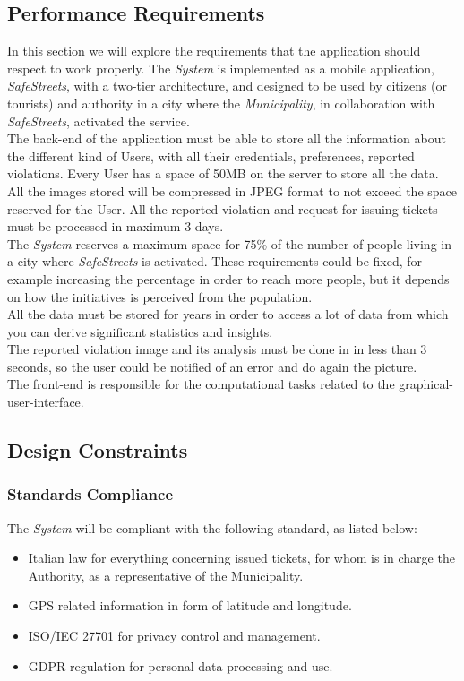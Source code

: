 \documentclass {article}
\begin{document}
	\subsection{Performance Requirements}
	In this section we will explore the requirements that the application should respect to work properly. The {\it System} is implemented as a mobile application, {\it SafeStreets}, with a two-tier architecture, and designed to be used by citizens (or tourists) and authority in a city where the {\it Municipality}, in collaboration with {\it SafeStreets}, activated the service. \\
	The back-end of the application must be able to store all the information about the different kind of Users, with all their credentials, preferences, reported violations. Every User has a space of 50MB on the server to store all the data. All the images stored will be compressed in JPEG format to not exceed the space reserved for the User. All the reported violation and request for issuing tickets must be processed in maximum 3 days.\\ 
	The {\it System} reserves a maximum space for 75\% of the number of people living in a city where {\it SafeStreets} is activated. These requirements could be fixed, for example increasing the percentage in order to reach more people, but it depends on how the initiatives is perceived from the population. \\
	All the data must be stored for years in order to access a lot of data from which you can derive significant statistics and insights. \\ 
	The reported violation image and its analysis must be done in in less than 3 seconds, so the user could be notified of an error and do again the picture. \\
	The front-end is responsible for the computational tasks related to the graphical-user-interface.
	\subsection{Design Constraints}
	\subsubsection{Standards Compliance}
	The {\it System} will be compliant with the following standard, as listed below:
	\begin{itemize}
		\item Italian law for everything concerning issued tickets, for whom is in charge the Authority, as a representative of the Municipality.
		\item GPS related information in form of latitude and longitude.
		\item ISO/IEC 27701 for privacy control and management.
		\item GDPR regulation for personal data processing and use.
	\end{itemize}
\end{document}
